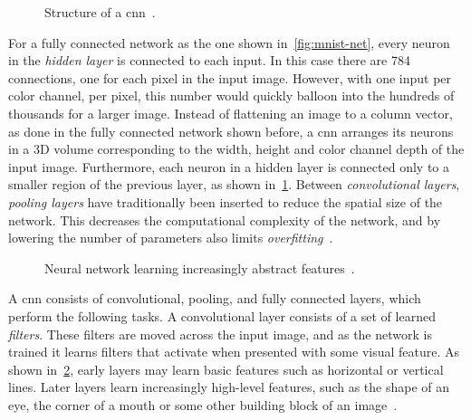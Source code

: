 \documentclass[\rootfolder/main.tex]{subfiles}
\begin{document}
\begin{figure}
    \caption[Structure of a \acrfull{cnn}.]{Structure of a \acrfull{cnn}~\cite{Mathworks}.}
    \label{fig:cnn-classification}
\end{figure}

For a fully connected network as the one shown in~\cref{fig:mnist-net}, every neuron in the \emph{hidden layer} is connected to each input.
In this case there are 784 connections, one for each pixel in the input image.
However, with one input per color channel, per pixel, this number would quickly balloon into the hundreds of thousands for a larger image.
Instead of flattening an image to a column vector, as done in the fully connected network shown before, a \acrshort{cnn} arranges its neurons in a 3D volume corresponding to the width, height and color channel depth of the input image.
Furthermore, each neuron in a hidden layer is connected only to a smaller region of the previous layer, as shown in~\cref{fig:cnn-classification}.
Between \emph{convolutional layers}, \emph{pooling layers} have traditionally been inserted to reduce the spatial size of the network.
This decreases the computational complexity of the network, and by lowering the number of parameters also limits \emph{overfitting}~\cite{Szegedy2014}.

\begin{figure}
    \caption[Neural network learning increasingly abstract features.]%
            {Neural network learning increasingly abstract features~\cite{Brown2015}.}
    \label{fig:abstract-features}
\end{figure}

A \acrshort{cnn} consists of convolutional, pooling, and fully connected layers, which perform the following tasks.
A convolutional layer consists of a set of learned \emph{filters}.
These filters are moved across the input image, and as the network is trained it learns filters that activate when presented with some visual feature.
As shown in~\cref{fig:abstract-features}, early layers may learn basic features such as horizontal or vertical lines.
Later layers learn increasingly high-level features, such as the shape of an eye, the corner of a mouth or some other building block of an image~\cite{Brown2015}.

\end{document}
